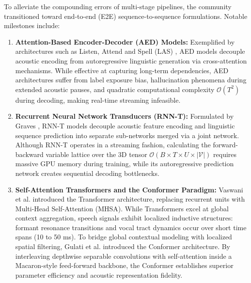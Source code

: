 To alleviate the compounding errors of multi-stage pipelines, the community transitioned toward end-to-end (E2E) sequence-to-sequence formulations. Notable milestones include:
\begin{enumerate}
    \item \textbf{Attention-Based Encoder-Decoder (AED) Models:} Exemplified by architectures such as Listen, Attend and Spell (LAS) \cite{chan2016listen}, AED models decouple acoustic encoding from autoregressive linguistic generation via cross-attention mechanisms. While effective at capturing long-term dependencies, AED architectures suffer from label exposure bias, hallucination phenomena during extended acoustic pauses, and quadratic computational complexity $\mathcal{O}(T^2)$ during decoding, making real-time streaming infeasible.
    \item \textbf{Recurrent Neural Network Transducers (RNN-T):} Formulated by Graves \cite{graves2012sequence}, RNN-T models decouple acoustic feature encoding and linguistic sequence prediction into separate sub-networks merged via a joint network. Although RNN-T operates in a streaming fashion, calculating the forward-backward variable lattice over the 3D tensor $\mathcal{O}(B \times T \times U \times |\mathcal{V}|)$ requires massive GPU memory during training, while its autoregressive prediction network creates sequential decoding bottlenecks.
    \item \textbf{Self-Attention Transformers and the Conformer Paradigm:} Vaswani et al. \cite{vaswani2017attention} introduced the Transformer architecture, replacing recurrent units with Multi-Head Self-Attention (MHSA). While Transformers excel at global context aggregation, speech signals exhibit localized inductive structures: formant resonance transitions and vocal tract dynamics occur over short time spans (10 to 50 ms). To bridge global contextual modeling with localized spatial filtering, Gulati et al. \cite{gulati2020conformer} introduced the Conformer architecture. By interleaving depthwise separable convolutions with self-attention inside a Macaron-style feed-forward backbone, the Conformer establishes superior parameter efficiency and acoustic representation fidelity.
\end{enumerate}

